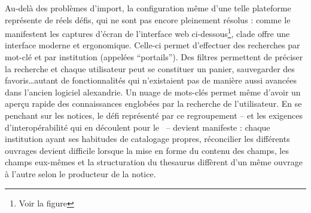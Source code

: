 Au-delà des problèmes d'import, la configuration même d'une telle plateforme représente de réels défis, qui ne sont pas encore pleinement résolus : comme le manifestent les captures d'écran de l'interface web ci-dessous\footnote{Voir la figure }, \gls{clade} offre une interface moderne et ergonomique. Celle-ci permet d'effectuer des recherches par mot-clé et par institution (appelées \enquote{portails}). Des filtres permettent de préciser la recherche et chaque utilisateur peut se constituer un panier, sauvegarder des favoris\dots autant de fonctionnalités qui n'existaient pas de manière aussi avancées dans l'ancien logiciel \gls{alexandrie}. Un nuage de mots-clés permet même d'avoir un aperçu rapide des connaissances englobées par la recherche de l'utilisateur. En se penchant sur les notices, le défi représenté par ce regroupement -- et les exigences d'interopérabilité qui en découlent pour le \mae~-- devient manifeste : chaque institution ayant ses habitudes de catalogage propres, réconcilier les différents ouvrages devient difficile lorsque la mise en forme du contenu des champs, les champs eux-mêmes et la structuration du \gls{thesaurus} diffèrent d'un même ouvrage à l'autre selon le producteur de la notice.


